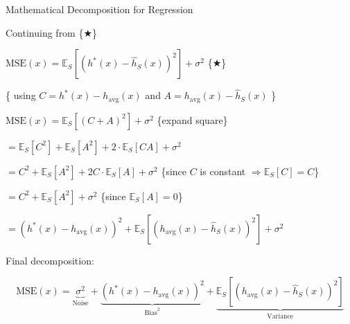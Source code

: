 \documentclass{beamer}
\begin{document}
\begin{frame}{Mathematical Decomposition for Regression}

\scriptsize{
    Continuing from \{$\bigstar$\}
    
    $\text{MSE}(x) = \mathbb{E}_S \left[ (h^*(x) - \hat{h}_S(x))^2 \right]  + \sigma^2$ \hfill \{$\bigstar$\}

    \vspace{0.2cm}

    \begin{center}
        \{ using $C = h^*(x) - h_{\text{avg}}(x)$ and $A = h_{\text{avg}}(x) - \hat{h}_S(x)$ \}
    \end{center} 

    \vspace{0.2cm}

    $\text{MSE}(x) = \mathbb{E}_S \left[ (C + A)^2 \right] + \sigma^2$  \hfill \{expand square\}

    \vspace{0.2cm}

    \hspace{1cm} $= \mathbb{E}_S[C^2] + \mathbb{E}_S[A^2] + 2 \cdot \mathbb{E}_S[CA] + \sigma^2$

    \vspace{0.2cm}

    \hspace{1cm} $= C^2 + \mathbb{E}_S [A^2] + 2C \cdot \mathbb{E}_S [A] + \sigma^2$ \hfill \{since $C$ is constant $\Rightarrow \mathbb{E}_S[C]=C$\}

    \vspace{0.2cm}

    \hspace{1cm} $= C^2 + \mathbb{E}_S [A^2] + \sigma^2$ \hfill \{since $\mathbb{E}_S[A] = 0$\}

    \vspace{0.2cm}

    \hspace{1cm} $= (h^*(x) - h_{\text{avg}}(x))^2 + \mathbb{E}_S \left[ (h_{\text{avg}}(x) - \hat{h}_S(x))^2 \right] + \sigma^2$ 

    \vspace{0.2cm}

    Final decomposition:

    \[
    \boxed{ \text{MSE}(x) = \underbrace{ \sigma^2 }_{\text{Noise}} + \underbrace{ (h^*(x) - h_{\text{avg}}(x))^2 }_{\text{Bias}^2} + \underbrace{ \mathbb{E}_S \left[ (h_{\text{avg}}(x) - \hat{h}_S(x))^2 \right] }_{\text{Variance}} }
    \]

}

\end{frame}
\end{document}
